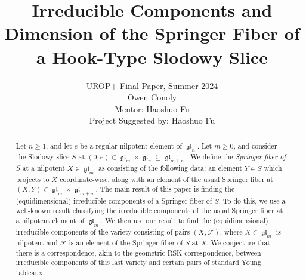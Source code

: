 \documentclass[12pt,psamsfonts]{article}
\author{
UROP+ Final Paper, Summer 2024\\
Owen Conoly\\
Mentor: Haoshuo Fu\\
Project Suggested by: Haoshuo Fu
}
\date{}
\title{Irreducible Components and Dimension of the Springer Fiber of a Hook-Type Slodowy Slice}
\DeclareMathOperator{\gl}{\mathfrak{gl}}
\begin{document}
\maketitle
\begin{abstract}
    Let \(n \geq 1\), and let \(e\) be a regular nilpotent element of \(\gl_n\).
    Let \(m \geq 0\), and consider the Slodowy slice \(S\) at \((0, e) \in \gl_m \times \gl_n \subseteq \gl_{m + n}\).
    We define the \emph{Springer fiber of S} at a nilpotent \(X \in \gl_m\) as consisting of the following data: an element \(Y \in S\) which projects to \(X\) coordinate-wise, along with an element of the usual Springer fiber at \((X, Y) \in \gl_m \times \gl_{m + n}\).
    The main result of this paper is finding the (equidimensional) irreducible components of a Springer fiber of \(S\).
    To do this, we use a well-known result classifying the irreducible components of the usual Springer fiber at a nilpotent element of \(\gl_m\).
    We then use our result to find the (equidimensional) irreducible components of the variety consisting of pairs \((X, \mathcal{F})\), where \(X \in \gl_m\) is nilpotent and \(\mathcal{F}\) is an element of the Springer fiber of \(S\) at \(X\).
    We conjecture that there is a correspondence, akin to the geometric RSK correspondence, between irreducible components of this last variety and certain pairs of standard Young tableaux. 
\end{abstract}

\tableofcontents
\end{document}
